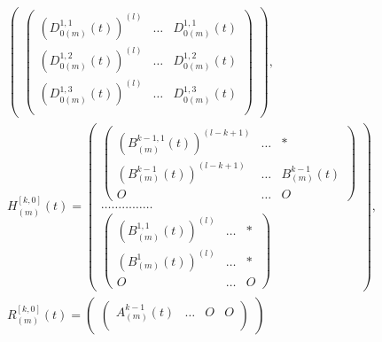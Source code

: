 \begin{pf}
\begin{gather*}
\begin{pmatrix}
\begin{pmatrix}


{(D_{0(m)}^{1,1}(t))}^{(l)} & \dotsc & D_{0(m)}^{1,1}(t)\\


{(D_{0(m)}^{1,2}(t))}^{(l)} & \dotsc & D_{0(m)}^{1,2}(t)\\


{(D_{0(m)}^{1,3}(t))}^{(l)} & \dotsc & D_{0(m)}^{1,3}(t)\\


\end{pmatrix}


\end{pmatrix}, \\


%


H_{(m)}^{[k,0]}(t)=


\begin{pmatrix}


\begin{pmatrix}


{(B_{(m)}^{k-1,1}(t))}^{(l-k+1)} & \dotsc & \ast\\


{(B_{(m)}^{k-1}(t))}^{(l-k+1)} & \dotsc & B_{(m)}^{k-1}(t)\\


O & \dotsc & O 


\end{pmatrix} \\


\dotsc\dotsc\dotsc \dotsc \dotsc \\


\begin{pmatrix}


{(B_{(m)}^{1,1}(t))}^{(l)} & \dotsc & \ast\\


{(B_{(m)}^{1}(t))}^{(l)} & \dotsc & \ast \\


O & \dotsc & O 


\end{pmatrix} 


\end{pmatrix}, \\


%


R_{(m)}^{[k,0]}(t)=


\begin{pmatrix}


\begin{pmatrix}


A_{(m)}^{k-1}(t) & \dotsc & O & O\\



\end{pmatrix}
\end{pmatrix}
\end{gather*}
\end{pf}
